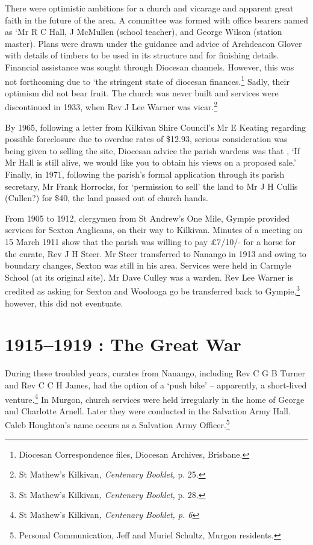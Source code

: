 There were optimistic ambitions for a church and vicarage and apparent great faith in the future of the area. A committee was formed with office bearers named as `Mr R C Hall, J McMullen (school teacher), and George Wilson (station master). Plans were drawn under the guidance and advice of Archdeacon Glover with details of timbers to be used in its structure and for finishing details. Financial assistance was sought through Diocesan channels. However, this was not forthcoming due to `the stringent state of diocesan finances.\footnote{Diocesan Correspondence files, Diocesan Archives, Brisbane.} Sadly, their optimism did not bear fruit. The church was never built and services were discontinued in 1933, when Rev J Lee Warner was vicar.\footnote{St Mathew's Kilkivan\emph{, Centenary Booklet,} p. 25.}

By 1965, following a letter from Kilkivan Shire Council's Mr E Keating regarding possible foreclosure due to overdue rates of \$12.93, serious consideration was being given to selling the site, Diocesan advice the parish wardens was that , `If Mr Hall is still alive, we would like you to obtain his views on a proposed sale.' Finally, in 1971, following the parish's formal application through its parish secretary, Mr Frank Horrocks, for `permission to sell' the land to Mr J H Cullis (Cullen?) for \$40, the land passed out of church hands.

From 1905 to 1912, clergymen from St Andrew's One Mile, Gympie provided services for Sexton Anglicans, on their way to Kilkivan. Minutes of a meeting on 15 March 1911 show that the parish was willing to pay £7/10/- for a horse for the curate, Rev J H Steer. Mr Steer transferred to Nanango in 1913 and owing to boundary changes, Sexton was still in his area. Services were held in Carmyle School (at its original site). Mr Dave Culley was a warden. Rev Lee Warner is credited as asking for Sexton and Woolooga go be transferred back to Gympie,\footnote{St Mathew's Kilkivan\emph{, Centenary Booklet,} p. 28.} however, this did not eventuate.

\hypertarget{the-great-war}{%
\section{1915--1919 : The Great War}\label{the-great-war}}

During these troubled years, curates from Nanango, including Rev C G B Turner and Rev C C H James\emph{,} had the option of a `push bike' -- apparently, a short-lived venture.\footnote{St Mathew's Kilkivan\emph{, Centenary Booklet, p. 6}} In Murgon, church services were held irregularly in the home of George and Charlotte Arnell. Later they were conducted in the Salvation Army Hall. Caleb Houghton's name occurs as a Salvation Army Officer.\footnote{Personal Communication, Jeff and Muriel Schultz, Murgon residents.}

